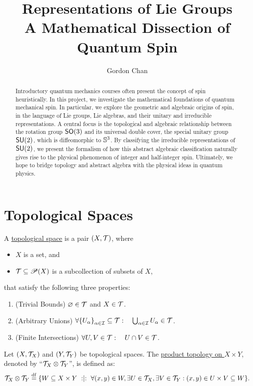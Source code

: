 \documentclass[11pt,reqno]{amsart}
\title{Representations of Lie Groups\\
A Mathematical Dissection of Quantum Spin}
\author{Gordon Chan}
\begin{document}
\begin{abstract}
Introductory quantum mechanics courses often present the concept of spin
heuristically. In this project, we investigate the mathematical foundations of
quantum mechanical spin. In particular, we explore the geometric and algebraic
origins of spin, in the language of Lie groups, Lie algebras, and their unitary
and irreducible representations. A central focus is the topological and
algebraic relationship between the rotation group $\SO(3)$ and its universal
double cover, the special unitary group $\SU(2)$, which is diffeomorphic to
$\S^3$. By classifying the irreducible representations of $\SU(2)$, we present
the formalism of how this abstract algebraic classification naturally gives
rise to the physical phenomenon of integer and half-integer spin.
Ultimately, we hope to bridge topology and abstract algebra with the
physical ideas in quantum physics.
\end{abstract}
\maketitle

\section{Topological Spaces}
\begin{Def}
A \ul{topological space} is a pair $(X,\T)$, where
\begin{itemize}
\item $X$ is a set, and
\item $\T\subseteq\P(X)$ is a subcollection of subsets of $X$,
\end{itemize}
that satisfy the following three properties:
\begin{enumerate}
\item(Trivial Bounds)
$\varnothing\in\T$ and $X\in\T$.
\item(Arbitrary Unions)
$\forall\set{U_\alpha}_{\alpha\in\I}\subseteq\T
:\quad\bigcup_{\alpha\in\I}U_\alpha\in\T$.
\item(Finite Intersections)
$\forall U,V\in\T:\quad U\cap V\in\T$.
\end{enumerate}
\end{Def}

\begin{Def}\label{product topology}
Let $(X,\T_X)$ and $(Y,\T_Y)$ be topological spaces.
The \ul{product topology on $X\times Y$}, denoted by
``$\T_X\otimes\T_Y$'', is defined as:
\[
\T_X\otimes\T_Y\df
\set{W\subseteq X\times Y\st
\forall(x,y)\in W,
\exists U\in\T_X,
\exists V\in\T_Y
:
(x,y)\in U\times V\subseteq W
}.
\]
\end{Def}
\end{document}
